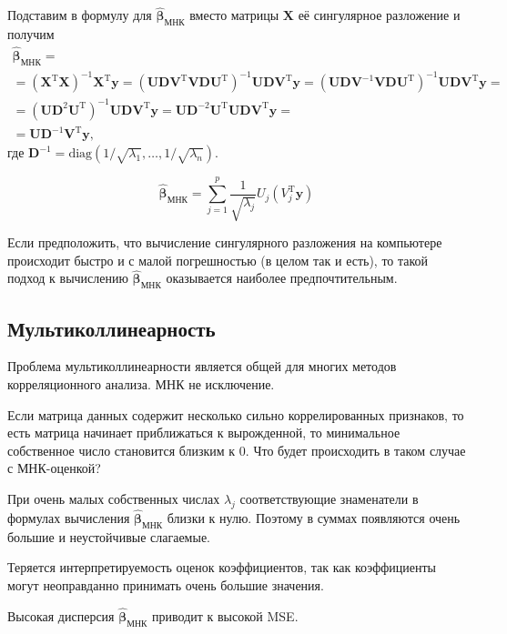 \documentclass[12pt,a4paper,final]{article}
\newcommand{\betah}{\hat{\bm \beta}}
\newcommand{\XT}{{\bm{X}}^{\mathrm{T}}}
\newcommand{\X}{\bm{X}}
\newcommand{\y}{\bm{y}}
\newcommand{\1}{\mathds{1}}
\begin{document}
Подставим в формулу для $\betah_{\text{МНК}}$ вместо матрицы $\X$ её сингулярное разложение и получим
\begin{multline}
  \label{eq:sing}
  \betah_{\text{МНК}} =\\= (\XT \X)^{-1}\XT \y = (\bm U \bm D \bm V^\mathrm T \bm V \bm D \bm U^\mathrm T)^{-1} \bm U \bm D \bm V^\mathrm T \y = (\bm U \bm D \bm V^{-1} \bm V \bm D \bm U^\mathrm T)^{-1} \bm U \bm D \bm V^\mathrm T \y = \\
  = (\bm U \bm D^2 \bm U^\mathrm T)^{-1} \bm U \bm D \bm V^\mathrm T \y = \bm U \bm D^{-2} \bm U^\mathrm T \bm U \bm D \bm V^\mathrm T \y =\\= \bm U \bm D^{-1} \bm V^\mathrm T \y,
\end{multline}
где $\bm D^{-1} = \mathrm{diag} (1/\sqrt{\lambda_1}, \ldots, 1/\sqrt{\lambda_n})$.

\begin{equation}
	\betah_{\text{МНК}}
	=
	\sum_{j=1}^{p}
	\frac{1}{\sqrt{\lambda_{j}}}
	U_{j}(V_{j}^{\mathrm{T}} \bm y)
\end{equation}

Если предположить, что вычисление сингулярного разложения на компьютере происходит быстро и с малой погрешностью (в целом так и есть), то такой подход к вычислению $\betah_{\text{МНК}}$ оказывается наиболее предпочтительным.

\subsection{Мультиколлинеарность}

Проблема мультиколлинеарности является общей для многих методов корреляционного анализа. МНК не исключение. 

Если матрица данных содержит несколько сильно коррелированных признаков, то есть матрица начинает приближаться к вырожденной, то минимальное собственное число становится близким к $0$.
Что будет происходить в таком случае с МНК-оценкой? 

При очень малых собственных числах $\lambda_{j}$ соответствующие знаменатели в формулах вычисления $\betah_{\text{МНК}}$ близки к нулю. Поэтому в суммах появляются очень большие и неустойчивые слагаемые.

Теряется интерпретируемость оценок коэффициентов, так как коэффициенты могут неоправданно принимать очень большие значения. 

Высокая дисперсия $\betah_{\text{МНК}}$ приводит к высокой MSE.
\end{document}
